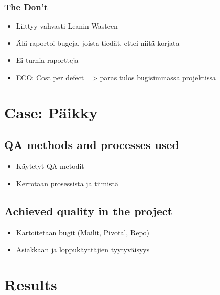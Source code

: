 ﻿\documentclass[12pt,a4paper,finnish]{tutthesis}
\begin{document}
 \subsection{The Don't}
 
 \begin{itemize}
 
 \item Liittyy vahvasti Leanin Wasteen
 \item Älä raportoi bugeja, joista tiedät, ettei niitä korjata
 \item Ei turhia raportteja
 \item ECO: Cost per defect => paras tulos bugisimmassa projektissa
 
 \end{itemize}
 
 \chapter{Case: Päikky}
 
 \section{QA methods and processes used}
 
 \begin{itemize}
 
 \item Käytetyt QA-metodit
 \item Kerrotaan prosessista ja tiimistä
 
 \end{itemize}
 
 \section{Achieved quality in the project}




 \begin{itemize}
 
 \item Kartoitetaan bugit (Mailit, Pivotal, Repo)  
 \item Asiakkaan ja loppukäyttäjien tyytyväisyys
 
 \end{itemize}
 
 \chapter{Results}
 
\end{document}
